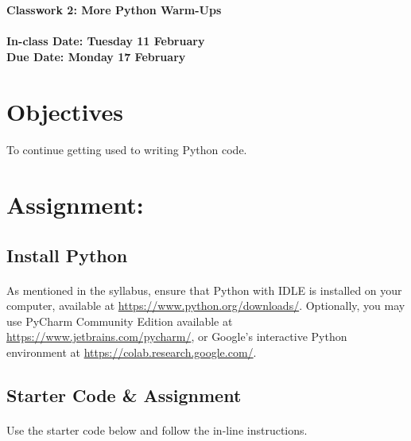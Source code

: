 \documentclass[letter,10pt]{article}
\begin{document}
    \huge
    \textbf{Classwork 2: More Python Warm-Ups}
    \normalsize
    \\ ~~ \\
    \textbf{In-class Date: Tuesday 11 February} \\
    \textbf{Due Date: Monday 17 February}
    
    \section*{Objectives}
    \paragraph{}To continue getting used to writing Python code.
    
    \section*{Assignment:}
    \subsection{Install Python}
    \paragraph{}As mentioned in the syllabus, ensure that Python with IDLE is installed on your computer, available at \url{https://www.python.org/downloads/}. Optionally, you may use PyCharm Community Edition available at \url{https://www.jetbrains.com/pycharm/}, or Google's interactive Python environment at \url{https://colab.research.google.com/}.
    
    \subsection*{Starter Code \& Assignment}
    \paragraph{}Use the starter code below and follow the in-line instructions.
    
\end{document}
